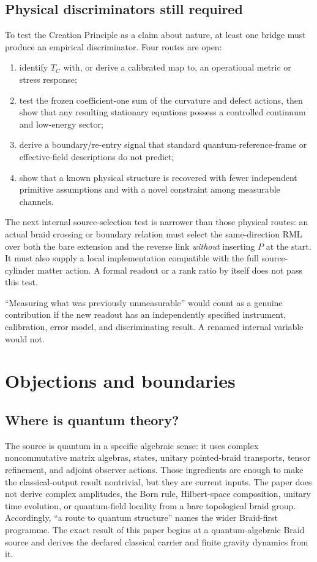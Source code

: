 \documentclass[11pt]{article}
\theoremstyle{definition}
\theoremstyle{remark}
\begin{document}
\subsection{Physical discriminators still required}

To test the Creation Principle as a claim about nature, at least one bridge must produce an empirical discriminator. Four routes are open:
\begin{enumerate}
\item identify $T_C$ with, or derive a calibrated map to, an operational metric or stress response;
\item test the frozen coefficient-one sum of the curvature and defect actions, then show that any resulting stationary equations possess a controlled continuum and low-energy sector;
\item derive a boundary/re-entry signal that standard quantum-reference-frame or effective-field descriptions do not predict;
\item show that a known physical structure is recovered with fewer independent primitive assumptions and with a novel constraint among measurable channels.
\end{enumerate}

The next internal source-selection test is narrower than those physical routes: an actual braid crossing or boundary relation must select the same-direction RML over both the bare extension and the reverse link \emph{without} inserting $P$ at the start. It must also supply a local implementation compatible with the full source-cylinder matter action. A formal readout or a rank ratio by itself does not pass this test.

``Measuring what was previously unmeasurable'' would count as a genuine contribution if the new readout has an independently specified instrument, calibration, error model, and discriminating result. A renamed internal variable would not.

\section{Objections and boundaries}

\subsection{Where is quantum theory?}

The source is quantum in a specific algebraic sense: it uses complex noncommutative matrix algebras, states, unitary pointed-braid transports, tensor refinement, and adjoint observer actions. Those ingredients are enough to make the classical-output result nontrivial, but they are current inputs. The paper does not derive complex amplitudes, the Born rule, Hilbert-space composition, unitary time evolution, or quantum-field locality from a bare topological braid group. Accordingly, ``a route to quantum structure'' names the wider Braid-first programme. The exact result of this paper begins at a quantum-algebraic Braid source and derives the declared classical carrier and finite gravity dynamics from it.
\end{document}
